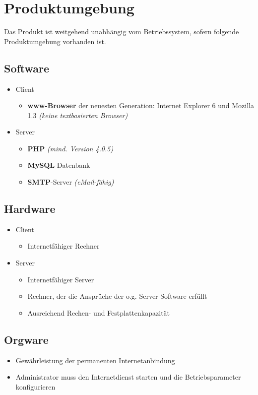 \section{Produktumgebung}


Das Produkt ist weitgehend unabhängig vom Betriebssystem, sofern folgende Produktumgebung vorhanden ist.

\subsection{Software}

\begin{itemize}
  \item Client
    \begin{itemize}
      \item \textbf{www-Browser} der neuesten Generation: Internet Explorer 6 und Mozilla 1.3 \textit{(keine textbasierten Browser)}
    \end{itemize}
  \item Server
    \begin{itemize}
      \item \textbf{PHP} \textit{(mind. Version 4.0.5)}
      \item \textbf{MySQL}-Datenbank
      \item \textbf{SMTP}-Server \textit{(eMail-fähig)}
    \end{itemize}
\end{itemize}

\subsection{Hardware}

\begin{itemize}
  \item Client
    \begin{itemize}
      \item Internetfähiger Rechner
    \end{itemize}
  \item Server
    \begin{itemize}
      \item Internetfähiger Server
      \item Rechner, der die Ansprüche der o.g. Server-Software erfüllt
      \item Ausreichend Rechen- und Festplattenkapazität
    \end{itemize}
\end{itemize}

\subsection{Orgware}

\begin{itemize}
  \item Gewährleistung der permanenten Internetanbindung
  \item Administrator muss den Internetdienst starten und die Betriebsparameter konfigurieren
\end{itemize}
